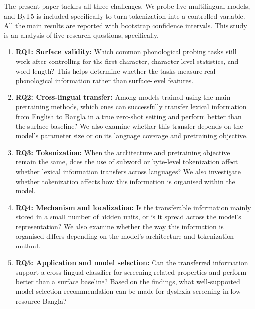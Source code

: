 \documentclass[preprint,12pt,authoryear]{elsarticle}
\begin{document}
The present paper tackles all three challenges. We probe five multilingual models, and ByT5 is included specifically to turn tokenization into a controlled variable. All the main results are reported with bootstrap confidence intervals. This study is an analysis of five research questions, specifically.
\begin{enumerate}
\item \textbf{RQ1: Surface validity:} Which common phonological probing tasks still work after controlling for the first character, character-level statistics, and word length? This helps determine whether the tasks measure real phonological information rather than surface-level features.
\item \textbf{RQ2: Cross-lingual transfer:} Among models trained using the main pretraining methods, which ones can successfully transfer lexical information from English to Bangla in a true zero-shot setting and perform better than the surface baseline? We also examine whether this transfer depends on the model's parameter size or on its language coverage and pretraining objective.
\item \textbf{RQ3: Tokenization:} When the architecture and pretraining objective remain the same, does the use of subword or byte-level tokenization affect whether lexical information transfers across languages? We also investigate whether tokenization affects how this information is organised within the model.
\item \textbf{RQ4: Mechanism and localization:} Is the transferable information mainly stored in a small number of hidden units, or is it spread across the model's representation? We also examine whether the way this information is organised differs depending on the model's architecture and tokenization method.
\item \textbf{RQ5: Application and model selection:} Can the transferred information support a cross-lingual classifier for screening-related properties and perform better than a surface baseline? Based on the findings, what well-supported model-selection recommendation can be made for dyslexia screening in low-resource Bangla?
\end{enumerate}
\end{document}
